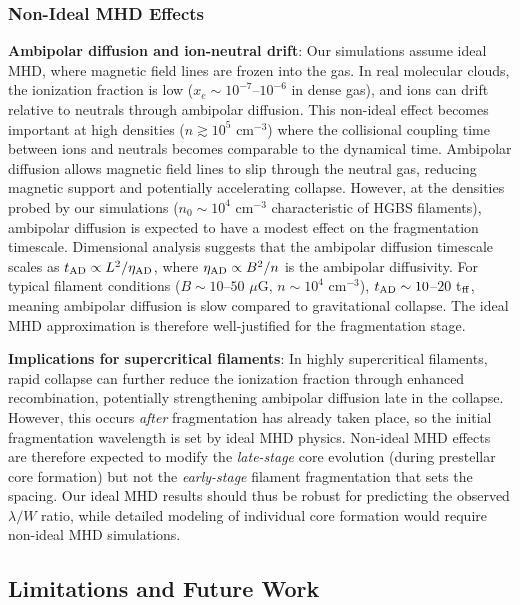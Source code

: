 \documentclass[twoside,twocolumn]{mnras}
\begin{document}
\subsubsection{Non-Ideal MHD Effects}

\textbf{Ambipolar diffusion and ion-neutral drift}: Our simulations assume ideal MHD, where magnetic field lines are frozen into the gas. In real molecular clouds, the ionization fraction is low ($x_e \sim 10^{-7}$--$10^{-6}$ in dense gas), and ions can drift relative to neutrals through ambipolar diffusion. This non-ideal effect becomes important at high densities ($n \gtrsim 10^5$ cm$^{-3}$) where the collisional coupling time between ions and neutrals becomes comparable to the dynamical time. Ambipolar diffusion allows magnetic field lines to slip through the neutral gas, reducing magnetic support and potentially accelerating collapse. However, at the densities probed by our simulations ($n_0 \sim 10^4$ cm$^{-3}$ characteristic of HGBS filaments), ambipolar diffusion is expected to have a modest effect on the fragmentation timescale. Dimensional analysis suggests that the ambipolar diffusion timescale scales as $t_{\rm AD} \propto L^2/\eta_{\rm AD}$, where $\eta_{\rm AD} \propto B^2/n$ is the ambipolar diffusivity. For typical filament conditions ($B \sim 10$--$50$ $\mu$G, $n \sim 10^4$ cm$^{-3}$), $t_{\rm AD} \sim 10$--$20$ t$_{\rm ff}$, meaning ambipolar diffusion is slow compared to gravitational collapse. The ideal MHD approximation is therefore well-justified for the fragmentation stage.

\textbf{Implications for supercritical filaments}: In highly supercritical filaments, rapid collapse can further reduce the ionization fraction through enhanced recombination, potentially strengthening ambipolar diffusion late in the collapse. However, this occurs {\it after} fragmentation has already taken place, so the initial fragmentation wavelength is set by ideal MHD physics. Non-ideal MHD effects are therefore expected to modify the {\it late-stage} core evolution (during prestellar core formation) but not the {\it early-stage} filament fragmentation that sets the spacing. Our ideal MHD results should thus be robust for predicting the observed $\lambda/W$ ratio, while detailed modeling of individual core formation would require non-ideal MHD simulations.

\subsection{Limitations and Future Work}
\end{document}
